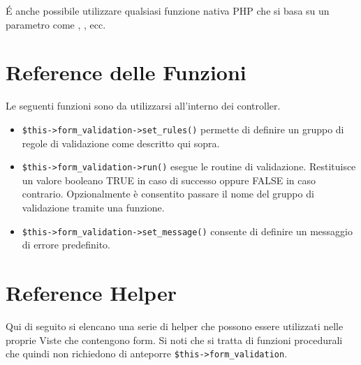 \'E anche possibile utilizzare qualsiasi funzione nativa \ac{PHP} che si basa su un parametro come  , , ecc.

\section*{Reference delle Funzioni}
Le seguenti funzioni sono da utilizzarsi all'interno dei controller.

\begin{itemize}
\item \verb|$this->form_validation->set_rules()| permette di definire un gruppo di regole di validazione come descritto qui sopra.

\item \verb|$this->form_validation->run()| esegue le routine di validazione. Restituisce un valore booleano TRUE in caso di successo oppure FALSE in caso contrario. Opzionalmente è consentito passare il nome del gruppo di validazione tramite una funzione.

\item \verb|$this->form_validation->set_message()| consente di definire un messaggio di errore predefinito.
\end{itemize}

\section*{Reference Helper}
Qui di seguito si elencano una serie di helper che possono essere utilizzati nelle proprie Viste che contengono form. Si noti che si tratta di funzioni procedurali che quindi non richiedono di anteporre \verb|$this->form_validation|.

